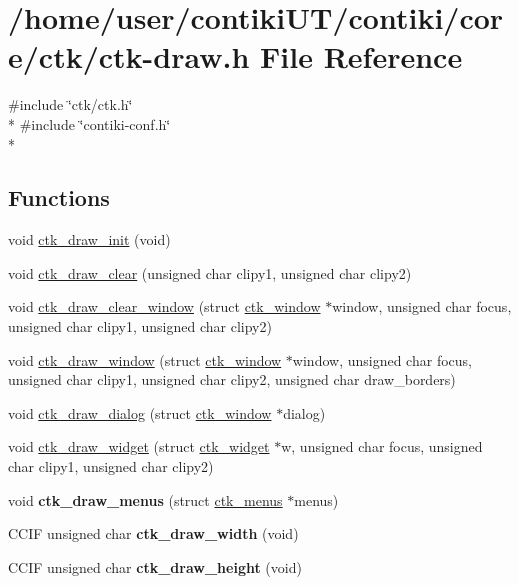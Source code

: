 \hypertarget{ctk-draw_8h}{}\section{/home/user/contiki\+U\+T/contiki/core/ctk/ctk-\/draw.h File Reference}
\label{ctk-draw_8h}
{\ttfamily \#include \char`\"{}ctk/ctk.\+h\char`\"{}}\\*
{\ttfamily \#include \char`\"{}contiki-\/conf.\+h\char`\"{}}\\*
\subsection*{Functions}
\begin{DoxyCompactItemize}
\item 
void \hyperlink{group__ctkdraw_ga271a33b474a94da63244e94c84127303}{ctk\+\_\+draw\+\_\+init} (void)
\item 
void \hyperlink{group__ctkdraw_gae6e8805e52467b2942c2af3e0080b6e1}{ctk\+\_\+draw\+\_\+clear} (unsigned char clipy1, unsigned char clipy2)
\item 
void \hyperlink{group__ctkdraw_gaeade88277aa23594cd8dc9f4caeba46d}{ctk\+\_\+draw\+\_\+clear\+\_\+window} (struct \hyperlink{structctk__window}{ctk\+\_\+window} $\ast$window, unsigned char focus, unsigned char clipy1, unsigned char clipy2)
\item 
void \hyperlink{group__ctkdraw_gae172d39b14556ee88707d4e6979abb34}{ctk\+\_\+draw\+\_\+window} (struct \hyperlink{structctk__window}{ctk\+\_\+window} $\ast$window, unsigned char focus, unsigned char clipy1, unsigned char clipy2, unsigned char draw\+\_\+borders)
\item 
void \hyperlink{group__ctkdraw_gae973e0af36f51f685e88216fa10ceb56}{ctk\+\_\+draw\+\_\+dialog} (struct \hyperlink{structctk__window}{ctk\+\_\+window} $\ast$dialog)
\item 
void \hyperlink{group__ctkdraw_ga2c09354ec5cfdb654b09cf478e8f2399}{ctk\+\_\+draw\+\_\+widget} (struct \hyperlink{structctk__widget}{ctk\+\_\+widget} $\ast$w, unsigned char focus, unsigned char clipy1, unsigned char clipy2)
\item 
\hypertarget{group__ctkdraw_gaa91a72c85f1c0a96ef85661b3b655067}{}void {\bfseries ctk\+\_\+draw\+\_\+menus} (struct \hyperlink{structctk__menus}{ctk\+\_\+menus} $\ast$menus)\label{group__ctkdraw_gaa91a72c85f1c0a96ef85661b3b655067}

\item 
\hypertarget{group__ctkdraw_ga573ade441a6b0b0ccbaf5f1ccc90fa9b}{}C\+C\+I\+F unsigned char {\bfseries ctk\+\_\+draw\+\_\+width} (void)\label{group__ctkdraw_ga573ade441a6b0b0ccbaf5f1ccc90fa9b}

\item 
\hypertarget{group__ctkdraw_gac8b314f484f9c768f337ab2daabf9318}{}C\+C\+I\+F unsigned char {\bfseries ctk\+\_\+draw\+\_\+height} (void)\label{group__ctkdraw_gac8b314f484f9c768f337ab2daabf9318}

\end{DoxyCompactItemize}

